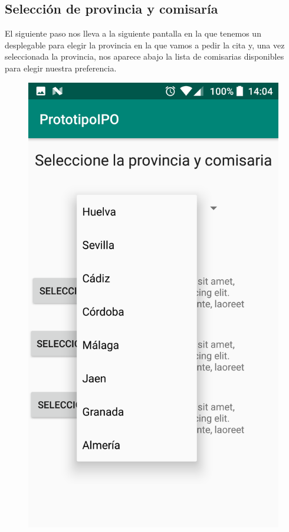 \documentclass[a4paper,11pt]{article}
\begin{document}
\subsection{Selección de provincia y comisaría}
El siguiente paso nos lleva a la siguiente pantalla en la que tenemos un desplegable para elegir la provincia en la que vamos a pedir la cita y, una vez seleccionada la provincia, nos aparece abajo la lista de comisarias disponibles para elegir nuestra preferencia.
\begin{figure}[H]
\centering
\begin{minipage}{0.45\linewidth}
\includegraphics[width=\textwidth]{6.png}

\end{minipage}
\end{figure}
\end{document}
